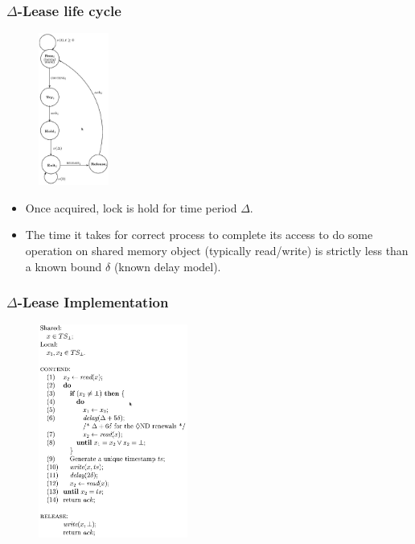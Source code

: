 \documentclass[10pt,utf8]{beamer}
\begin{document}
\begin{frame}
    \frametitle{$\Delta$-Lease life cycle}
    \begin{figure}
        \centering
        \includegraphics[height=5cm]{./img/delta-lease-life-cycle.eps}
    \end{figure}
    
    \centering
    \begin{itemize}
     \item Once acquired, lock is hold for time period $\Delta$.
     \item The time it takes for correct process to complete its access to do some operation on shared memory object (typically read/write) is strictly less than a known bound $\delta$ (known delay model).
    \end{itemize}
\end{frame}

\begin{frame}
    \frametitle{$\Delta$-Lease Implementation}
    \begin{figure}
        \centering
        \includegraphics[height=7cm]{./img/delta-lease-alg.eps}
    \end{figure}
\end{frame}
\end{document}
